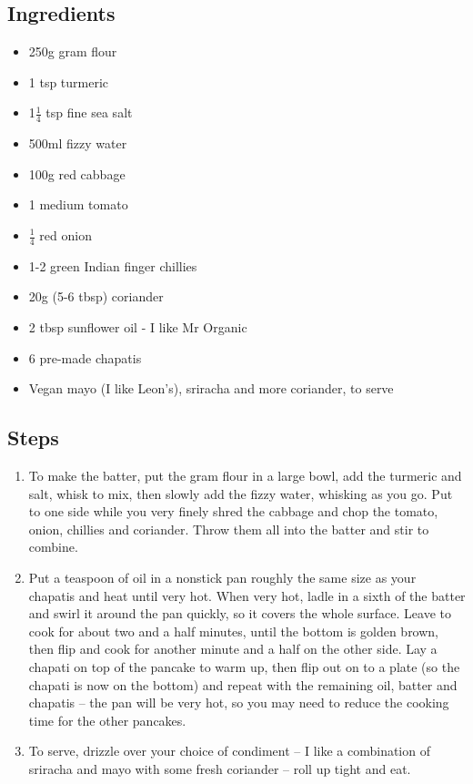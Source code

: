 \documentclass{book}
\begin{document}
\subsection*{Ingredients}
\begin{itemize}
\item 250g gram flour 
\item 1 tsp turmeric 
\item 1$\frac{1}{4}$ tsp fine sea salt 
\item 500ml fizzy water
\item 100g red cabbage
\item 1 medium tomato 
\item $\frac{1}{4}$ red onion 
\item 1-2 green Indian finger chillies
\item 20g (5-6 tbsp) coriander 
\item 2 tbsp sunflower oil - I like Mr Organic
\item 6 pre-made chapatis 
\item Vegan mayo (I like Leon’s), sriracha and more coriander, to serve
\end{itemize}

\subsection*{Steps}
\begin{enumerate}
\item To make the batter, put the gram flour in a large bowl, add the turmeric and salt, whisk to mix, then slowly add the fizzy water, whisking as you go. Put to one side while you very finely shred the cabbage and chop the tomato, onion, chillies and coriander. Throw them all into the batter and stir to combine.
\item Put a teaspoon of oil in a nonstick pan roughly the same size as your chapatis and heat until very hot. When very hot, ladle in a sixth of the batter and swirl it around the pan quickly, so it covers the whole surface. Leave to cook for about two and a half minutes, until the bottom is golden brown, then flip and cook for another minute and a half on the other side. Lay a chapati on top of the pancake to warm up, then flip out on to a plate (so the chapati is now on the bottom) and repeat with the remaining oil, batter and chapatis – the pan will be very hot, so you may need to reduce the cooking time for the other pancakes.
\item To serve, drizzle over your choice of condiment – I like a combination of sriracha and mayo with some fresh coriander – roll up tight and eat.
\end{enumerate}
\newpage
\end{document}
